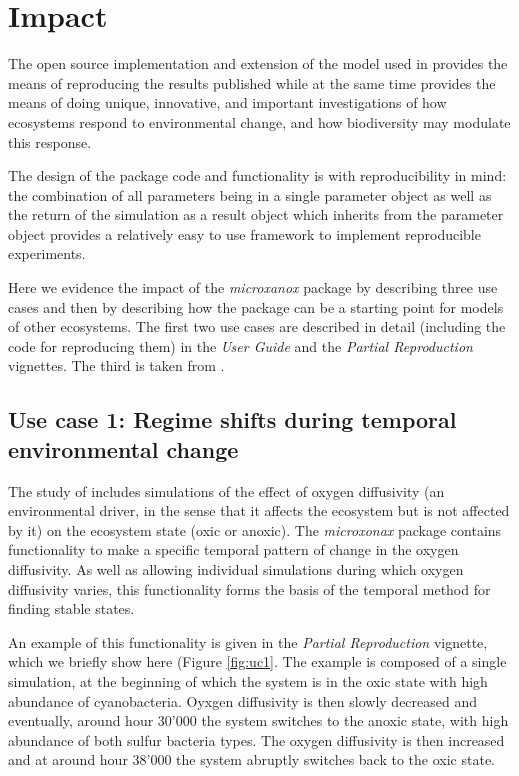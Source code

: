 \documentclass[]{elsarticle} %
\begin{document}
\hypertarget{impact}{%
\section{Impact}\label{impact}}

The open source implementation and extension of the model used in
\citet{Bush2017} provides the means of reproducing the results published
while at the same time provides the means of doing unique, innovative,
and important investigations of how ecosystems respond to environmental
change, and how biodiversity may modulate this response.

The design of the package code and functionality is with reproducibility
in mind: the combination of all parameters being in a single parameter
object as well as the return of the simulation as a result object which
inherits from the parameter object provides a relatively easy to use
framework to implement reproducible experiments.

Here we evidence the impact of the \emph{microxanox} package by
describing three use cases and then by describing how the package can be
a starting point for models of other ecosystems. The first two use cases
are described in detail (including the code for reproducing them) in the
\emph{User Guide} and the \emph{Partial Reproduction} vignettes. The
third is taken from \citet{REF_NEEDED}.

\hypertarget{use-case-1-regime-shifts-during-temporal-environmental-change}{%
\subsection{Use case 1: Regime shifts during temporal environmental
change}\label{use-case-1-regime-shifts-during-temporal-environmental-change}}

The study of \citet{Bush2017} includes simulations of the effect of
oxygen diffusivity (an environmental driver, in the sense that it
affects the ecosystem but is not affected by it) on the ecosystem state
(oxic or anoxic). The \emph{microxonax} package contains functionality
to make a specific temporal pattern of change in the oxygen diffusivity.
As well as allowing individual simulations during which oxygen
diffusivity varies, this functionality forms the basis of the temporal
method for finding stable states.

An example of this functionality is given in the \emph{Partial
Reproduction} vignette, which we briefly show here (Figure
\ref{fig:uc1}. The example is composed of a single simulation, at the
beginning of which the system is in the oxic state with high abundance
of cyanobacteria. Oyxgen diffusivity is then slowly decreased and
eventually, around hour 30'000 the system switches to the anoxic state,
with high abundance of both sulfur bacteria types. The oxygen
diffusivity is then increased and at around hour 38'000 the system
abruptly switches back to the oxic state.
\end{document}
